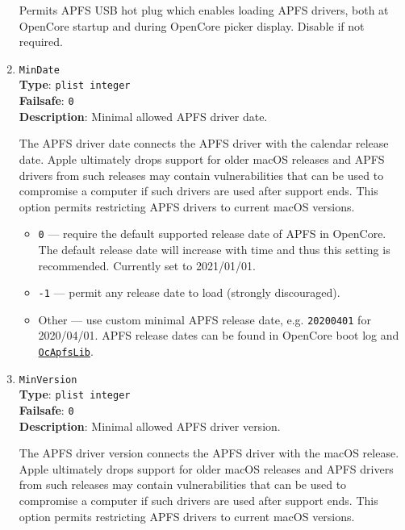 \documentclass[]{article}
\providecommand{\tightlist}{%
  \setlength{\itemsep}{0pt}\setlength{\parskip}{0pt}}
\begin{document}
\begin{enumerate}
  Permits APFS USB hot plug which enables loading APFS drivers, both at OpenCore
  startup and during OpenCore picker display. Disable if not required.

\item
  \texttt{MinDate}\\
  \textbf{Type}: \texttt{plist\ integer}\\
  \textbf{Failsafe}: \texttt{0}\\
  \textbf{Description}: Minimal allowed APFS driver date.

  The APFS driver date connects the APFS driver with the calendar release date.
  Apple ultimately drops support for older macOS releases and APFS drivers from
  such releases may contain vulnerabilities that can be used to compromise
  a computer if such drivers are used after support ends. This option
  permits restricting APFS drivers to current macOS versions.

  \begin{itemize}
    \tightlist
    \item \texttt{0} --- require the default supported release date of APFS
    in OpenCore. The default release date will increase with time and thus
    this setting is recommended. Currently set to 2021/01/01.
    \item \texttt{-1} --- permit any release date to load (strongly discouraged).
    \item Other --- use custom minimal APFS release date, e.g. \texttt{20200401}
    for 2020/04/01. APFS release dates can be found in OpenCore boot log
    and \href{https://github.com/acidanthera/OpenCorePkg/blob/master/Include/Acidanthera/Library/OcApfsLib.h}{\texttt{OcApfsLib}}.
  \end{itemize}

\item
  \texttt{MinVersion}\\
  \textbf{Type}: \texttt{plist\ integer}\\
  \textbf{Failsafe}: \texttt{0}\\
  \textbf{Description}: Minimal allowed APFS driver version.

  The APFS driver version connects the APFS driver with the macOS release.
  Apple ultimately drops support for older macOS releases and APFS drivers from
  such releases may contain vulnerabilities that can be used to compromise
  a computer if such drivers are used after support ends. This option
  permits restricting APFS drivers to current macOS versions.


\end{enumerate}
\end{document}
